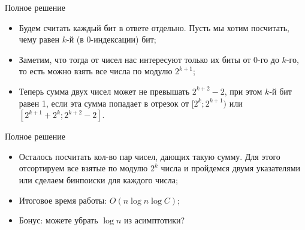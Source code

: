 \begin{frame}{Полное решение}
  \begin{itemize}
      \item Будем считать каждый бит в ответе отдельно. Пусть мы хотим посчитать, чему равен $k$-й (в 0-индексации) бит;
      \item Заметим, что тогда от чисел нас интересуют только их биты от $0$-го до $k$-го, то есть можно взять все числа по модулю $2^{k + 1}$;
      \item Теперь сумма двух чисел может не превышать $2^{k + 2} - 2$, при этом $k$-й бит равен 1, если эта сумма попадает в отрезок от $[2^k; 2^{k + 1})$ или $[2^{k + 1} + 2^k; 2^{k + 2} - 2]$.
  \end{itemize}
\end{frame}

\begin{frame}{Полное решение}
  \begin{itemize}
      \item Осталось посчитать кол-во пар чисел, дающих такую сумму. Для этого отсортируем все взятые по модулю $2^k$ числа и пройдемся двумя указателями или сделаем бинпоиски для каждого числа;
      \item Итоговое время работы: $O(n \log n \log C)$;
      \item Бонус: можете убрать $\log n$ из асимптотики?
  \end{itemize}
\end{frame}
